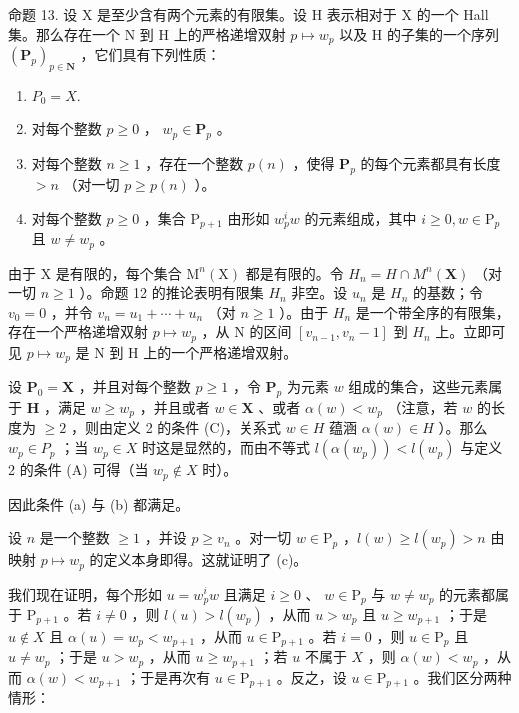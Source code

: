 命题 13. 设 X 是至少含有两个元素的有限集。设 H 表示相对于 X 的一个 Hall 集。那么存在一个 N 到 H 上的严格递增双射 \(p \mapsto w_p\) 以及 H 的子集的一个序列 \((\mathbf{P}_p)_{p \in \mathbf{N}}\) ，它们具有下列性质：

\begin{enumerate}
\def\labelenumi{(\alph{enumi})}
\item
  \(P_{0} = X.\)
\item
  对每个整数 \(p \geqslant 0\) ， \(w_{p} \in \mathbf{P}_{p}\) 。
\item
  对每个整数 \(n \geqslant 1\) ，存在一个整数 \(p(n)\) ，使得 \(\mathbf{P}_p\) 的每个元素都具有长度 \(> n\) （对一切 \(p \geqslant p(n)\) ）。
\item
  对每个整数 \(p \geqslant 0\) ，集合 \(\mathrm{P}_{p+1}\) 由形如 \(w_p^i w\) 的元素组成，其中 \(i \geqslant 0, w \in \mathrm{P}_p\) 且 \(w \neq w_p\) 。
\end{enumerate}

由于 X 是有限的，每个集合 \(\mathrm{M}^{n}(\mathrm{X})\) 都是有限的。令 \(H_{n}=H\cap M^{n}(\mathbf{X})\) （对一切 \(n\geqslant1\) ）。命题 12 的推论表明有限集 \(H_{n}\) 非空。设 \(u_{n}\) 是 \(H_{n}\) 的基数；令 \(v_{0}=0\) ，并令 \(v_{n}=u_{1}+\cdots+u_{n}\) （对 \(n\geqslant1\) ）。由于 \(H_{n}\) 是一个带全序的有限集，存在一个严格递增双射 \(p\mapsto w_{p}\) ，从 N 的区间 \([v_{n-1},v_{n}-1]\) 到 \(H_{n}\) 上。立即可见 \(p\mapsto w_{p}\) 是 N 到 H 上的一个严格递增双射。

设 \(\mathbf{P}_0 = \mathbf{X}\) ，并且对每个整数 \(p \geqslant 1\) ，令 \(\mathbf{P}_p\) 为元素 \(w\) 组成的集合，这些元素属于 \(\mathbf{H}\) ，满足 \(w \geqslant w_p\) ，并且或者 \(w \in \mathbf{X}\) 、或者 \(\alpha(w) < w_p\) （注意，若 \(w\) 的长度为 \(\geqslant2\) ，则由定义 2 的条件 (C)，关系式 \(w\in H\) 蕴涵 \(\alpha(w)\in H\) ）。那么 \(w_{p}\in P_{p}\) ；当 \(w_{p}\in X\) 时这是显然的，而由不等式 \(l(\alpha(w_{p}))<l(w_{p})\) 与定义 2 的条件 (A) 可得（当 \(w_{p}\notin X\) 时）。

因此条件 (a) 与 (b) 都满足。

设 \(n\) 是一个整数 \(\geqslant 1\) ，并设 \(p \geqslant v_n\) 。对一切 \(w \in \mathrm{P}_p\) ，\(l(w) \geqslant l(w_p) > n\) 由映射 \(p \mapsto w_p\) 的定义本身即得。这就证明了 (c)。

我们现在证明，每个形如 \(u = w_{p}^{i}w\) 且满足 \(i \geqslant 0\) 、 \(w \in \mathrm{P}_{p}\) 与 \(w \neq w_{p}\) 的元素都属于 \(\mathrm{P}_{p+1}\) 。若 \(i \neq 0\) ，则 \(l(u) > l(w_{p})\) ，从而 \(u > w_{p}\) 且 \(u \geqslant w_{p+1}\) ；于是 \(u \notin X\) 且 \(\alpha(u) = w_{p} < w_{p+1}\) ，从而 \(u \in \mathrm{P}_{p+1}\) 。若 \(i = 0\) ，则 \(u \in \mathrm{P}_{p}\) 且 \(u \neq w_{p}\) ；于是 \(u > w_{p}\) ，从而 \(u \geqslant w_{p+1}\) ；若 \(u\) 不属于 \(X\) ，则 \(\alpha(w) < w_{p}\) ，从而 \(\alpha(w) < w_{p+1}\) ；于是再次有 \(u \in \mathrm{P}_{p+1}\) 。反之，设 \(u \in \mathrm{P}_{p+1}\) 。我们区分两种情形：

